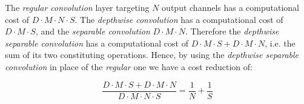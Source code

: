 The \textit{regular convolution} layer targeting $N$ output channels has a computational cost of $D \cdot M \cdot N \cdot S$. The \textit{depthwise convolution} has a computational cost of $D \cdot M \cdot S$,  and the \textit{separable convolution} $D \cdot M \cdot N$. Therefore the \textit{depthwise separable convolution} has a computational cost  of $D \cdot M  \cdot S + D \cdot M \cdot N$, i.e. the sum of its two constituting operations. Hence, by using the \textit{depthwise separable convolution} in place of the \textit{regular} one we have a cost reduction of:

$$ \frac{D \cdot M \cdot S  + D \cdot M \cdot N} {D \cdot M \cdot N \cdot S} = \frac{1}{N} + \frac{1}{S} $$
%
%
%
%

